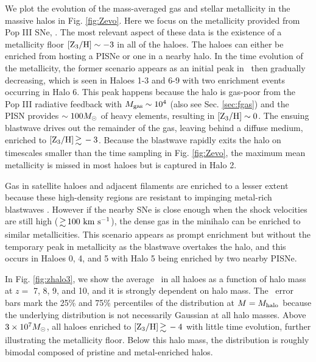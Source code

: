 \documentclass[useAMS,usenatbib]{mn2e}
\begin{document}
We plot the evolution of the mass-averaged gas and stellar metallicity
in the massive halos in Fig. \ref{fig:Zevo}.  Here we focus on the
metallicity provided from Pop III SNe, \zthree.  The most relevant
aspect of these data is the existence of a metallicity floor $\zthree
\sim -3$ in all of the haloes.  The haloes can either be enriched from
hosting a PISNe or one in a nearby halo.  In the time evolution of the
metallicity, the former scenario appears as an initial peak in
\zthree~then gradually decreasing, which is seen in Haloes 1-3 and 6-9
with two enrichment events occurring in Halo 6.  This peak happens
because the halo is gas-poor from the Pop III radiative feedback with
$M_{\rm gas} \sim 10^4$ (also see Sec. \ref{sec:fgas}) and the PISN
provides $\sim 100 \Ms$ of heavy elements, resulting in $\zthree \sim
0$.  The ensuing blastwave drives out the remainder of the gas,
leaving behind a diffuse medium, enriched to $\zthree \ga -3$.
Because the blastwave rapidly exits the halo on timescales smaller
than the time sampling in Fig. \ref{fig:Zevo}, the maximum mean
metallicity is missed in most haloes but is captured in Halo 2.

Gas in satellite haloes and adjacent filaments are enriched to a
lesser extent because these high-density regions are resistant to
impinging metal-rich blastwaves \citep[cf.][]{Cen08}.  However if the
nearby SNe is close enough when the shock velocities are still high
($\ga 100~\kms$), the dense gas in the minihalo can be enriched to
similar metallicities.  This scenario appears as prompt enrichment but
without the temporary peak in metallicity as the blastwave overtakes
the halo, and this occurs in Haloes 0, 4, and 5 with Halo 5 being
enriched by two nearby PISNe.

In Fig. \ref{fig:zhalo3}, we show the average \zthree~in all haloes as
a function of halo mass at $z =$ 7, 8, 9, and 10, and it is strongly
dependent on halo mass.  The \zthree~error bars mark the 25\% and 75\%
percentiles of the distribution at $M = M_{\rm halo}$ because the
underlying distribution is not necessarily Gaussian at all halo
masses.  Above $3 \times 10^7 \Ms$, all haloes enriched to $\zthree
\ga -4$ with little time evolution, further illustrating the
metallicity floor.  Below this halo mass, the distribution is roughly
bimodal composed of pristine and metal-enriched halos.
\end{document}
